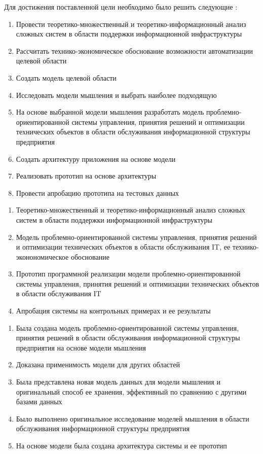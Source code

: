 Для достижения поставленной цели необходимо было решить следующие {\tasks}:
\begin{enumerate}
  \item Провести теоретико-множественный и теоретико-информационный анализ сложных систем в области поддержки информационной инфраструктуры
  \item Рассчитать технико-экономическое обоснование возможности автоматизации целевой области
  \item Создать модель целевой области
  \item Исследовать модели мышления и выбрать наиболее подходящую
  \item На основе выбранной модели мышления разработать модель проблемно-ориентированной системы управления, принятия решений и оптимизации технических объектов в области обслуживания информационной структуры предприятия
  \item Создать архитектуру приложения на основе модели
  \item Реализовать прототип на основе архитектуры
  \item Провести апробацию прототипа на тестовых данных
\end{enumerate}

\begin{enumerate}
  \item Теоретико-множественный и теоретико-информационный анализ сложных систем в области поддержки информационной инфраструктуры
  \item Модель проблемно-ориентированной системы управления, принятия решений и оптимизации технических объектов в области обслуживания IT, ее технико-эконономическое обоснование  
  \item Прототип программной реализации модели проблемно-ориентированной системы управления, принятия решений и оптимизации технических объектов в области обслуживания IT  
  \item Апробация системы на контрольных примерах и ее результаты
\end{enumerate}

\novelty
\begin{enumerate}
  \item Была создана модель проблемно-ориентированной системы управления, принятия решений в области обслуживания информационной структуры предприятия на основе модели мышления
  \item Доказана применимость модели для других областей
  \item Была представлена новая модель данных для модели мышления и оригинальный способ ее хранения, эффективный по сравнению с другими базами данных
  \item Было выполнено оригинальное исследование моделей мышления в области обслуживания информационной структуры предприятия
  \item На основе модели была создана архитектура системы и ее прототип 
\end{enumerate}

